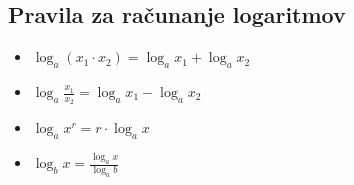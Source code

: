 \documentclass{article}
\newcounter{example}[section]
\newenvironment{example}[1][]{\refstepcounter{example}\par\medskip
   \noindent \textbf{Naloga~\theexample. #1} \rmfamily}{\medskip}
\newtheorem*{zgled}{Zgled}
\begin{document}
\subsection{Pravila za računanje logaritmov}

\begin{itemize}
    \item $\log_a (x_1 \cdot x_2) =\log_a x_1 + \log_a x_2$
    \item $\log_a \frac{x_1}{x_2} =\log_a x_1 - \log_a x_2$
    \item $\log_a x^r = r\cdot\log_a x$
    \item $\log_b x=\frac{\log_a x}{\log_a b}$
\end{itemize}

\end{document}
